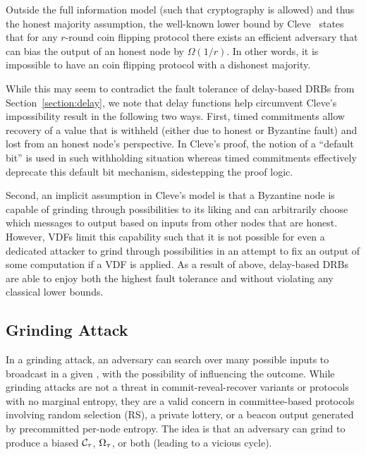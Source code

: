 Outside the full information model (such that cryptography is allowed) and thus the honest majority assumption, the well-known lower bound by Cleve~\cite{cleve1986limits} states that for any $r$-round coin flipping protocol there exists an efficient adversary that can bias the output of an honest node by $\Omega(1 / r)$.
In other words, it is impossible to have an \drbsecure coin flipping protocol with a dishonest majority.

While this may seem to contradict the fault tolerance of delay-based DRBs from Section~\ref{section:delay}, we note that delay functions help circumvent Cleve's impossibility result in the following two ways.
First, timed commitments allow recovery of a value that is withheld (either due to honest or Byzantine fault) and lost from an honest node's perspective.
In Cleve's proof, the notion of a ``default bit'' is used in such withholding situation whereas timed commitments effectively deprecate this default bit mechanism, sidestepping the proof logic.

Second, an implicit assumption in Cleve's model is that a Byzantine node is capable of grinding through possibilities to its liking and can arbitrarily choose which messages to output based on inputs from other nodes that are honest.
However, VDFs limit this capability such that it is not possible for even a dedicated attacker to grind through possibilities in an attempt to fix an output of some computation if a VDF is applied.
As a result of above, delay-based DRBs are able to enjoy both the highest fault tolerance and \drbsecurity without violating any classical lower bounds.

\iffalse
\subsection{Grinding Attack}
In a grinding attack, an adversary can search over many possible inputs to broadcast in a given \epoch, with the possibility of influencing the outcome. While grinding attacks are not a threat in commit-reveal-recover variants or protocols with no marginal entropy, they are a valid concern in committee-based protocols involving random selection (RS), a private lottery, or a beacon output generated by precommitted per-node entropy. The idea is that an adversary can grind to produce a biased $\mathcal{C}_\tau$, $\Omega_\tau$, or both (leading to a vicious cycle).

